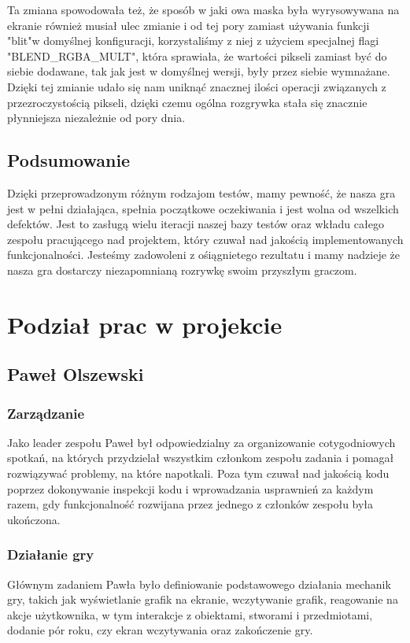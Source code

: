 \documentclass{article}
\begin{document}
Ta zmiana spowodowała też, że sposób w jaki owa maska była wyrysowywana na ekranie również musiał ulec zmianie i od tej pory zamiast używania funkcji "blit"\space w domyślnej konfiguracji, korzystaliśmy z niej z użyciem specjalnej flagi "BLEND\_RGBA\_MULT", która sprawiała, że wartości pikseli zamiast być do siebie dodawane, tak jak jest w domyślnej wersji, były przez siebie wymnażane. Dzięki tej zmianie udało się nam uniknąć znacznej ilości operacji związanych z przezroczystością pikseli, dzięki czemu ogólna rozgrywka stała się znacznie płynniejsza niezależnie od pory dnia.

\subsection{Podsumowanie}
Dzięki przeprowadzonym różnym rodzajom testów, mamy pewność, że nasza gra jest w pełni działająca, spełnia początkowe oczekiwania i jest wolna od wszelkich defektów. Jest to zasługą wielu iteracji naszej bazy testów oraz wkładu całego zespołu pracującego nad projektem, który czuwał nad jakością implementowanych funkcjonalności. Jesteśmy zadowoleni z ośiągnietego rezultatu i mamy nadzieje że nasza gra dostarczy niezapomnianą rozrywkę swoim przyszłym graczom.
\section{Podział prac w projekcie}
\subsection{Paweł Olszewski}
\subsubsection{Zarządzanie}
Jako leader zespołu Paweł był odpowiedzialny za organizowanie cotygodniowych spotkań, na których przydzielał wszystkim członkom zespołu zadania i pomagał rozwiązywać problemy, na które napotkali. Poza tym czuwał nad jakością kodu poprzez dokonywanie inspekcji kodu\cite{wiki:inspekcja} i wprowadzania usprawnień za każdym razem, gdy funkcjonalność rozwijana przez jednego z członków zespołu była ukończona.

\subsubsection{Działanie gry}
Głównym zadaniem Pawła było definiowanie podstawowego działania mechanik gry, takich jak wyświetlanie grafik na ekranie, wczytywanie grafik, reagowanie na akcje użytkownika, w tym interakcje z obiektami, stworami i przedmiotami, dodanie pór roku, czy ekran wczytywania oraz zakończenie gry.
\end{document}
